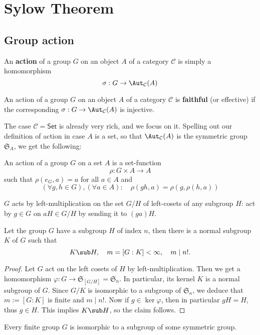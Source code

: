\section{Sylow Theorem}
\subsection{Group action}
An \textbf{action} of a group $G$ on an object $A$ of a category $\mathcal{C}$ is simply a homomorphism
\[\sigma:G\to\Aut_{\mathcal{C}}(A)\]
\begin{definition}
An action of a group $G$ on an object $A$ of a category $\mathcal{C}$ is \textbf{faithful} (or effective) if the corresponding $\sigma:G\to\Aut_{\mathcal{C}}(A)$ is injective.
\end{definition}
The case $\mathcal{C}=\mathsf{Set}$ is already very rich, and we focus on it. Spelling out our definition of action in case $A$ is a set, so that $\Aut_{\mathcal{C}}(A)$ is the symmetric group $\mathfrak{S}_A$, we get the following:
\begin{definition}
An action of a group $G$ on a set $A$ is a set-function
\[\rho:G\times A\to A\]
such that $\rho(e_G,a)=a$ for all $a\in A$ and
\[(\forall g,h\in G),(\forall a\in A):\quad\rho(gh,a)=\rho(g,\rho(h,a))\]
\end{definition}
\begin{example}
$G$ acts by left-multiplication on the set $G/H$ of left-cosets of any subgroup $H$: act by $g\in G$ on $aH\in G/H$ by sending it to $(ga)H$.
\end{example}
\begin{theorem}\label{Cayley theorem}
Let the group $G$ have a subgroup $H$ of index $n$, then there is a normal subgroup $K$ of $G$ such that
\[K\sub H,\quad m=[G:K]<\infty,\quad m\mid n!.\]
\end{theorem}
\begin{proof}
Let $G$ act on the left cosets of $H$ by left-multiplication. Then we get a homomorphism $\varphi:G\to\mathfrak{S}_{[G/H]}=\mathfrak{S}_n$. In particular, its kernel $K$ is a normal subgroup of $G$. Since $G/K$ is isomorphic to a subgroup of $\mathfrak{S}_n$, we deduce that $m:=[G:K]$ is finite and $m\mid n!$. Now if $g\in\ker\varphi$, then in particular $gH=H$, thus $g\in H$. This implies $K\sub H$, so the claim follows.
\end{proof}
\begin{corollary}
Every finite group $G$ is isomorphic to a subgroup of some symmetric group.
\end{corollary}
